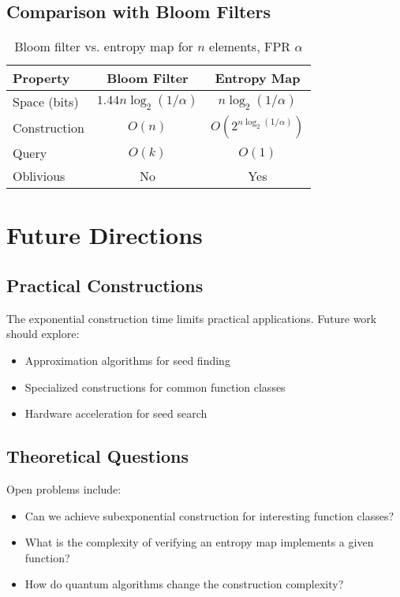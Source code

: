 \documentclass[11pt,final,hidelinks]{article}
\newcommand{\fprate}{\alpha}
\begin{document}
\subsection{Comparison with Bloom Filters}

\begin{table}[h]
\centering
\begin{tabular}{lcc}
\toprule
Property & Bloom Filter & Entropy Map \\
\midrule
Space (bits) & $1.44n\log_2(1/\fprate)$ & $n\log_2(1/\fprate)$ \\
Construction & $O(n)$ & $O(2^{n\log_2(1/\fprate)})$ \\
Query & $O(k)$ & $O(1)$ \\
Oblivious & No & Yes \\
\bottomrule
\end{tabular}
\caption{Bloom filter vs. entropy map for $n$ elements, FPR $\fprate$}
\end{table}

\section{Future Directions}

\subsection{Practical Constructions}

The exponential construction time limits practical applications. Future work should explore:
\begin{itemize}
    \item Approximation algorithms for seed finding
    \item Specialized constructions for common function classes
    \item Hardware acceleration for seed search
\end{itemize}

\subsection{Theoretical Questions}

Open problems include:
\begin{itemize}
    \item Can we achieve subexponential construction for interesting function classes?
    \item What is the complexity of verifying an entropy map implements a given function?
    \item How do quantum algorithms change the construction complexity?
\end{itemize}
\end{document}
